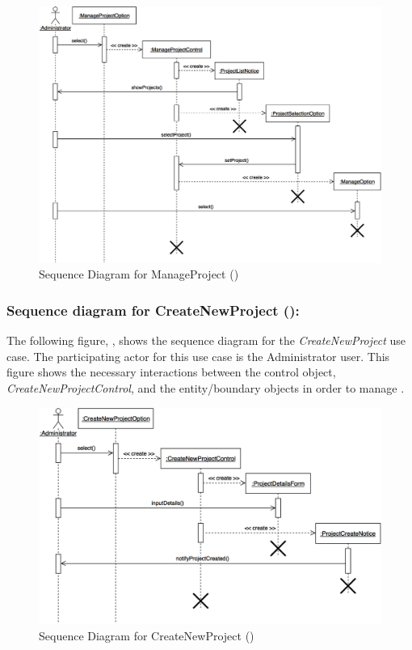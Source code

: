 \documentclass[12pt,letterpaper]{article}
\begin{document}
\begin{figure}[H]
	\centering{}
	\includegraphics[scale=0.24]{imgs/seq/manage-project.png}
	\caption[ - Sequence Diagram for ManageProject]{Sequence Diagram for ManageProject ()}
\end{figure}

\subsubsection*{Sequence diagram for CreateNewProject ():}

The following figure, , shows the sequence diagram for the {\it CreateNewProject} use case. The participating actor for this use case is
the Administrator user. This figure shows the necessary interactions between the control object, {\it CreateNewProjectControl}, and the
entity/boundary objects in order to manage .

\begin{figure}[H]
	\centering{}
	\includegraphics[scale=0.24]{imgs/seq/create-new-project.png}
	\caption[ - Sequence Diagram for CreateNewProject]{Sequence Diagram for CreateNewProject ()}
\end{figure}
\end{document}
